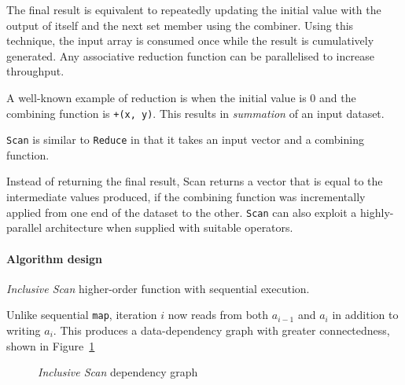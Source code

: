 The final result is equivalent to repeatedly updating the initial value with the output of itself and the next set member using the combiner. Using this technique, the input array is consumed once while the result is cumulatively generated. Any associative reduction function can be parallelised to increase throughput.

A well-known example of reduction is when the initial value is $0$ and the combining function is \verb|+(x, y)|. This results in \emph{summation} of an input dataset.

\verb|Scan| is similar to \verb|Reduce| in that it takes an input vector and a combining function.

Instead of returning the final result, Scan returns a vector that is equal to the intermediate values produced, if the combining function was incrementally applied from one end of the dataset to the other. \verb|Scan| can also exploit a highly-parallel architecture when supplied with suitable operators.

\paragraph*{Algorithm design}
\begin{algorithm}
  \caption{\emph{Inclusive Scan} higher-order function with sequential execution.}
  \label{alg:seqscan}

  \begin{algorithmic}
      \EndFor
    \EndFunction
  \end{algorithmic}
\end{algorithm}

Unlike sequential \verb|map|, iteration $i$ now reads from both $a_{i-1}$ and $a_{i}$ in addition to writing $a_i$. This produces a data-dependency graph with greater connectedness, shown in Figure~\ref{fig:scangraph}

\begin{figure}[h]
  \caption{\emph{Inclusive Scan} dependency graph}
  \label{fig:scangraph}
  \begin{center}
  \end{center}
\end{figure}

